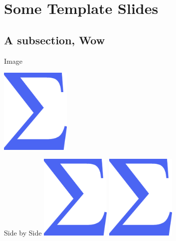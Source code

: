 \documentclass[aspectratio=169]{beamer}
\begin{document}
\section{Some Template Slides}
\frame{\sectionpage}

\subsection{A subsection, Wow}
\frame{\subsectionpage}

\begin{frame}{Image}
  \begin{center}
    \includegraphics[width=0.25\textwidth]{sigma.png}
  \end{center}
\end{frame}

\begin{frame}{Side by Side}
    \includegraphics[width=0.25\textwidth]{sigma.png}\hspace{0.4\textwidth}
    \includegraphics[width=0.25\textwidth]{sigma.png}
\end{frame}
\end{document}
